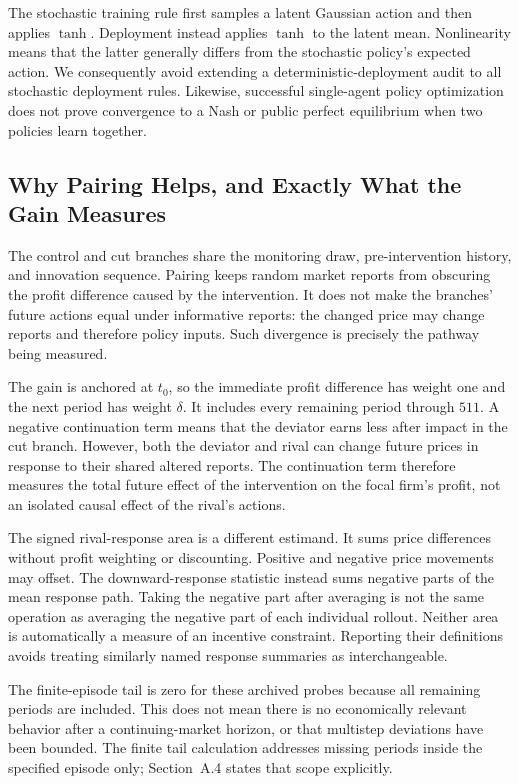 \documentclass{article}
\begin{document}
The stochastic training rule first samples a latent Gaussian action and then applies $\tanh$. Deployment instead applies $\tanh$ to the latent mean. Nonlinearity means that the latter generally differs from the stochastic policy's expected action. We consequently avoid extending a deterministic-deployment audit to all stochastic deployment rules. Likewise, successful single-agent policy optimization does not prove convergence to a Nash or public perfect equilibrium when two policies learn together.

\subsection{Why Pairing Helps, and Exactly What the Gain Measures}

The control and cut branches share the monitoring draw, pre-intervention history, and innovation sequence. Pairing keeps random market reports from obscuring the profit difference caused by the intervention. It does not make the branches' future actions equal under informative reports: the changed price may change reports and therefore policy inputs. Such divergence is precisely the pathway being measured.

The gain is anchored at $t_0$, so the immediate profit difference has weight one and the next period has weight $\delta$. It includes every remaining period through $511$. A negative continuation term means that the deviator earns less after impact in the cut branch. However, both the deviator and rival can change future prices in response to their shared altered reports. The continuation term therefore measures the total future effect of the intervention on the focal firm's profit, not an isolated causal effect of the rival's actions.

The signed rival-response area is a different estimand. It sums price differences without profit weighting or discounting. Positive and negative price movements may offset. The downward-response statistic instead sums negative parts of the mean response path. Taking the negative part after averaging is not the same operation as averaging the negative part of each individual rollout. Neither area is automatically a measure of an incentive constraint. Reporting their definitions avoids treating similarly named response summaries as interchangeable.

The finite-episode tail is zero for these archived probes because all remaining periods are included. This does not mean there is no economically relevant behavior after a continuing-market horizon, or that multistep deviations have been bounded. The finite tail calculation addresses missing periods inside the specified episode only; Section~A.4 states that scope explicitly.
\end{document}
